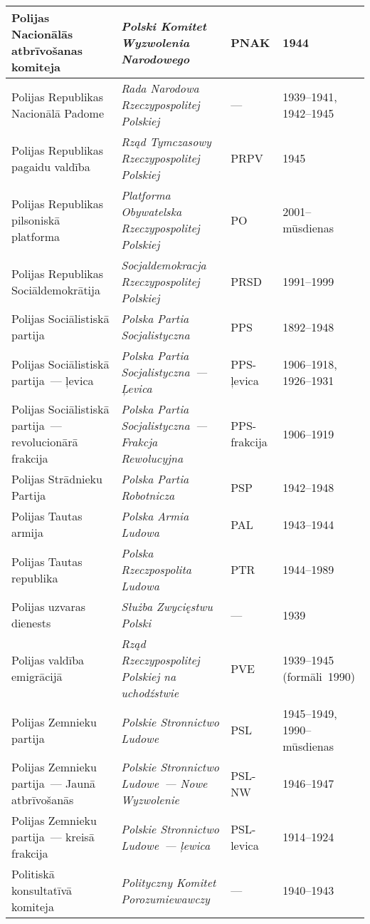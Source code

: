 \documentclass[twoside,a5paper,12pt,fleqn,openany]{extbook}
\newcommand{\pltxti}[1]{\textit{\textpolish{#1}}}
\begin{document}
\begin{footnotesize}
\begin{tabularx}{\linewidth}{|p{3cm}|p{3.5cm}|p{1.4cm}|p{1.6cm}|}
\hline
Polijas Nacionālās atbrīvošanas komiteja & \pltxti{Polski Komitet Wyzwolenia Narodowego} & PNAK & 1944 \\
\hline
Polijas Republikas Nacionālā Padome & \pltxti{Rada Narodowa Rzeczypospolitej Polskiej} & --- & 1939--1941, 1942--1945 \\
\hline
Polijas Republikas pagaidu valdība & \pltxti{Rząd Tymczasowy Rzeczypospolitej Polskiej} & PRPV & 1945 \\
\hline
Polijas Republikas pilsoniskā platforma & \pltxti{Platforma Obywatelska Rzeczypospolitej Polskiej} & PO & 2001--mūsdienas \\
\hline
Polijas Republikas Sociāldemokrātija & \pltxti{Socjaldemokracja Rzeczypospolitej Polskiej} & PRSD & 1991--1999 \\
\hline
Polijas Sociālistiskā partija & \pltxti{Polska Partia Socjalistyczna} & PPS & 1892--1948 \\
\hline
Polijas Sociālistiskā partija~--- ļevica & \pltxti{Polska Partia Socjalistyczna~--- Ļevica} & PPS-ļevica & 1906--1918, 1926--1931 \\
\hline
Polijas Sociālistiskā partija~--- revolucionārā frakcija & \pltxti{Polska Partia Socjalistyczna~--- Frakcja Rewolucyjna} & PPS-frakcija & 1906--1919 \\
\hline
Polijas Strādnieku Partija & \pltxti{Polska Partia Robotnicza} & PSP & 1942--1948 \\
\hline
Polijas Tautas armija & \pltxti{Polska Armia Ludowa} & PAL & 1943--1944 \\
\hline
Polijas Tautas republika & \pltxti{Polska Rzeczpospolita Ludowa} & PTR & 1944--1989 \\
\hline
Polijas uzvaras dienests & \pltxti{Służba Zwycięstwu Polski} & --- & 1939 \\
\hline
Polijas valdība emigrācijā & \pltxti{Rząd Rzeczypospolitej Polskiej na uchodźstwie} & PVE & 1939--1945 (formāli~1990) \\
\hline
Polijas Zemnieku partija & \pltxti{Polskie Stronnictwo Ludowe} & PSL & 1945--1949, 1990--mūsdienas \\
\hline
Polijas Zemnieku partija~--- Jaunā atbrīvošanās & \pltxti{Polskie Stronnictwo Ludowe~--- Nowe Wyzwolenie} & PSL-NW & 1946--1947 \\
\hline
Polijas Zemnieku partija~--- kreisā frakcija & \pltxti{Polskie Stronnictwo Ludowe~--- ļewica} & PSL-levica & 1914--1924 \\
\hline
Politiskā konsultatīvā komiteja & \pltxti{Polityczny Komitet Porozumiewawczy} & --- & 1940--1943 \\

\end{tabularx}
\end{footnotesize}
\end{document}
